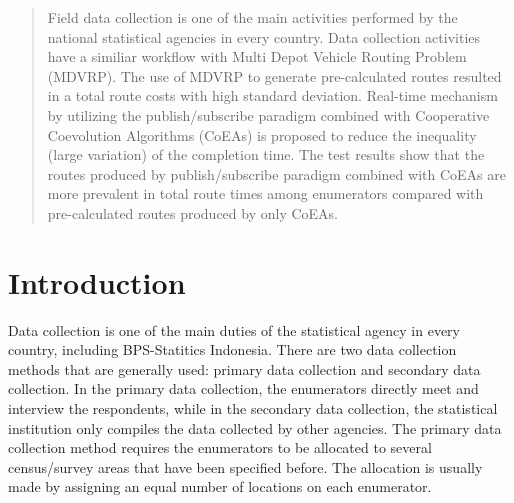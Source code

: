 \documentclass[conference]{IEEEtran}
\begin{document}




\maketitle

\begin{abstract}
Field data collection is one of the main activities performed by the national statistical agencies in every country. Data collection activities have a similiar workflow with Multi Depot Vehicle Routing Problem (MDVRP). The use of MDVRP to generate pre-calculated routes resulted in a total route costs with high standard deviation. Real-time mechanism by utilizing the publish/subscribe paradigm combined with Cooperative Coevolution Algorithms (CoEAs) is proposed to reduce the inequality (large variation) of the completion time. The test results show that the routes produced by publish/subscribe paradigm combined with CoEAs are more prevalent in total route times among enumerators compared with pre-calculated routes produced by only CoEAs.
\end{abstract}





%
\IEEEpeerreviewmaketitle




\section{Introduction}
\label{sec:introduction}
Data collection is one of the main duties of the statistical agency in every country, including BPS-Statitics Indonesia. There are two data collection methods that are generally used: primary data collection and secondary data collection. In the primary data collection, the enumerators directly meet and interview the respondents, while in the secondary data collection, the statistical institution only compiles the data collected by other agencies. The primary data collection method requires the enumerators to be allocated to several census/survey areas that have been specified before. The allocation is usually made by assigning an equal number of locations on each enumerator.
\end{document}
